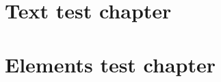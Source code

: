 \documentclass[paper=a4, fontsize=12pt]{report}
\begin{document}
	\begin{titlepage}
		\printTitlePage		
	\end{titlepage}
	

	\chapter{Text test chapter}\label{sec:first}
	

	
	\chapter{Elements test chapter}\label{sec:second}
	
	
	
\end{document}
